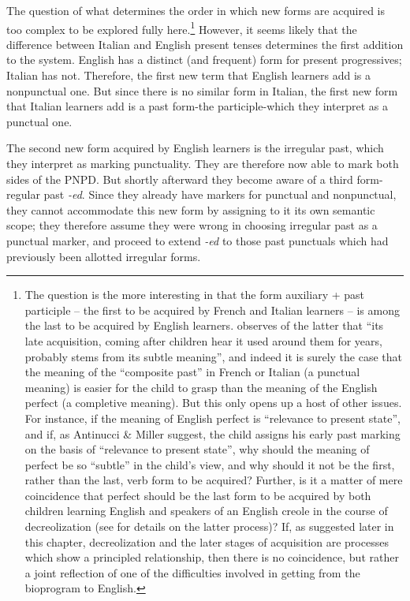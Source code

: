 The question of what determines the order in which new forms are acquired is too complex to be explored fully here.\footnote{The question is the more interesting in that the form auxiliary + past participle -- the first to be acquired by French and Italian learners -- is among the last to be acquired by English learners. \citet{Maratsos1979} observes of the latter that ``its late acquisition, coming after children hear it used around them for years, probably stems from its subtle meaning'', and indeed it is surely the case that the meaning of the ``composite past'' in French or Italian (a punctual meaning) is easier for the child to grasp than the meaning of the English perfect (a completive meaning). But this only opens up a host of other issues. For instance, if the meaning of English perfect is ``relevance to present state'', and if, as Antinucci \& Miller suggest, the child assigns his early past marking on the basis of ``relevance to present state'', why should the meaning of perfect be so ``subtle'' in the child's view, and why should it not be the first, rather than the last, verb form to be acquired? Further, is it a matter of mere coincidence that perfect should be the last form to be acquired by both children learning English and speakers of an English creole in the course of decreolization (see \citet[126ff.]{Bickerton1975} for details on the latter process)? If, as suggested later in this chapter, decreolization and the later stages of acquisition are processes which show a principled relationship, then there is no coincidence, but rather a joint reflection of one of the difficulties involved in getting from the bioprogram to English.} However, it seems likely that the difference between Italian and English present tenses determines the first addition to the system. English has a dis\-tinct (and frequent) form for present progressives; Italian has not. Therefore, the first new term that English learners add is a nonpunctual one. But since there is no similar form in Italian, the first new form that Italian learners add is a past form-the participle-which they interpret as a punctual one.

The second new form acquired by English learners is the irregular past, which they interpret as marking punctuality. They are therefore now able to mark both sides of the PNPD. But shortly afterward they become aware of a third form-regular past \textit{-ed}. Since they already have markers for punctual and nonpunctual, they cannot accommodate this new form by assigning to it its own semantic scope; they therefore assume they were wrong in choosing irregular past as a punctual marker, and proceed to extend \textit{-ed} to those past punctuals which had previously been allotted irregular forms.

